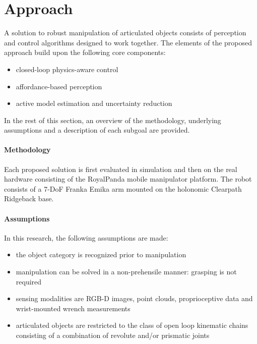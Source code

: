 \section{Approach}
\label{sec:Approach}

A solution to robust manipulation of articulated objects consists of perception and control algorithms designed to work together. The elements of the proposed approach build upon the following core components:
\begin{itemize}
\item closed-loop physics-aware control
\item affordance-based perception
\item active model estimation and uncertainty reduction
\end{itemize}
In the rest of this section, an overview of the methodology, underlying assumptions and a description of each subgoal are provided. 

\paragraph{Methodology} Each proposed solution is first evaluated in simulation and then on the real hardware consisting of the RoyalPanda mobile manipulator platform. The robot consists of a 7-DoF Franka Emika arm mounted on the holonomic Clearpath Ridgeback base. 

\paragraph{Assumptions} In this research, the following assumptions are made:
\begin{itemize}
\item the object category is recognized prior to manipulation
\item manipulation can be solved in a non-prehensile manner: grasping is not required
\item sensing modalities are RGB-D images, point clouds, proprioceptive data and wrist-mounted wrench measurements 
\item articulated objects are restricted to the class of open loop kinematic chains consisting of a combination of revolute and/or prismatic joints
\end{itemize} 

